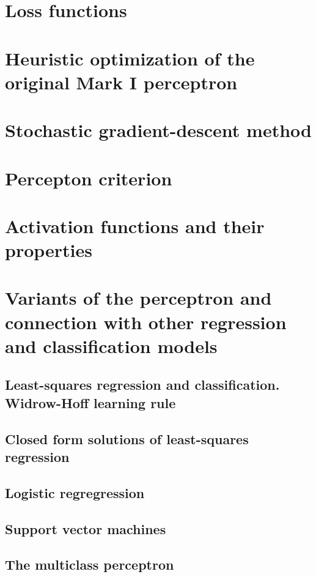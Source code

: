 \section{Loss functions}

\section{Heuristic optimization of the original Mark I perceptron}

\section{Stochastic gradient-descent method}

\section{Percepton criterion}

\section{Activation functions and their properties}

\section{Variants of the perceptron and 
    connection with other regression and classification models}

\subsection{Least-squares regression and classification. Widrow-Hoff learning rule}

\subsection{Closed form solutions of least-squares regression}

\subsection{Logistic regregression}

\subsection{Support vector machines}

\subsection{The multiclass perceptron}

